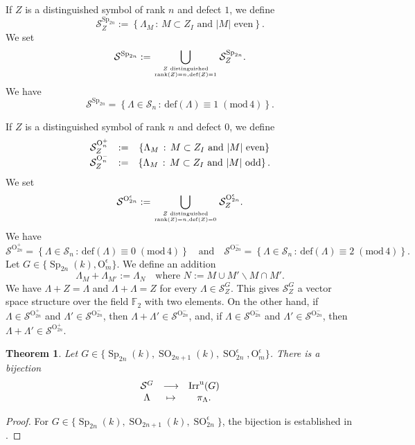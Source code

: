 \documentclass[12pt]{amsart}
\numberwithin{equation}{subsection}
\newtheorem{thm}[equation]{Theorem}
\newcommand{\FF}{\mathbb{F}}
\newcommand{\cS}{\mathcal{S}}
\newcommand{\unip}{\mathrm{u}}
\newcommand{\rank}{\operatorname{rank}}
\newcommand{\Irr}{\operatorname{Irr}}
\newcommand{\Sp}{\operatorname{Sp}}
\newcommand{\SO}{\operatorname{SO}}
\def\rO{{\mathrm{O}}}
\def\defect{{\mathrm{def}}}
\def\modu{{\mathrm{mod}}}
\def\modu{{\mathrm{mod}}}
\begin{document}
If $Z$ is a distinguished symbol of rank $n$ and defect $1$, we define 
\begin{equation}
\cS_Z^{\Sp_{2n}}:=\left\{\Lambda_M\,:\, \text{$M\subset Z_I$ and $|M|$ even}\right\}.
\end{equation}
We set
\begin{equation}
\cS^{\Sp_{2n}}:=\bigcup_{\text{$Z$ distinguished}\atop\rank(Z)=n,\defect(Z)=1}
\cS_Z^{\Sp_{2n}}.
\end{equation}
We have 
\begin{equation}
\cS^{\Sp_{2n}}=\left\{\Lambda\in\cS_n\,:\,\defect(\Lambda)\equiv 1\;(\modu \,4)\right\}.
\end{equation}

If $Z$ is a distinguished symbol of rank $n$ and defect $0$, we define 
\begin{equation}
\begin{matrix}
\cS_Z^{\rO^+_n}&:=&\left\{\Lambda_M\,:\, \text{$M\subset Z_I$ and $|M|$ even}\right\}\cr
\cS_Z^{\rO^-_n}&:=&\left\{\Lambda_M\,:\, \text{$M\subset Z_I$ and $|M|$ odd}\right\}.
\end{matrix}
\end{equation}
We set
\begin{equation}
\cS^{\rO_{2n}^\epsilon}:=\bigcup_{\text{$Z$ distinguished}\atop\rank(Z)=n,\defect(Z)=0} \cS_Z^{\rO^\epsilon_{2n}}.
\end{equation}
We have 
\[
\cS^{\rO_{2n}^+}=\left\{\Lambda\in\cS_n\,:\,\defect(\Lambda)\equiv 0\;(\modu \,4)\right\}\quad\text{and}\quad
\cS^{\rO_{2n}^-}=\left\{\Lambda\in\cS_n\,:\,\defect(\Lambda)\equiv 2\;(\modu \,4)\right\}.
\]
Let $G\in\{\Sp_{2n}(k),  \rO_{m}^\epsilon\}$. We define an addition
\begin{equation}
\Lambda_{M}+\Lambda_{M'}:=\Lambda_N\quad\text{where $N:=M\cup M'\backslash M\cap M'$.}
\end{equation}
We have $\Lambda+Z=\Lambda$ and $\Lambda+\Lambda=Z$ for every $\Lambda\in\cS_Z^G$. This gives $\cS_Z^G$ a vector space
structure over the field $\FF_2$ with two elements.
On the other hand, if $\Lambda\in\cS^{\rO_{2n}^+}$ and $\Lambda'\in\cS^{\rO_{2n}^-}$, then $\Lambda+\Lambda'\in\cS^{\rO_{2n}^-}$, and, if  $\Lambda\in\cS^{\rO_{2n}^-}$ and $\Lambda'\in\cS^{\rO_{2n}^-} $, 
then $\Lambda+\Lambda'\in\cS^{\rO_{2n}^+}$.

\begin{thm} \label{thm:Lusz-Class}
Let $G\in\{\Sp_{2n}(k), \SO_{2n+1}(k),\SO^\epsilon_{2n}, \rO_{m}^\epsilon\}$.
There is a bijection
\begin{equation} \label{eqn:Lus77Sp}
\begin{matrix}\cS^{G}&\longrightarrow&\Irr^\unip(G)\cr
\Lambda&\mapsto& \pi_\Lambda.
\end{matrix}
\end{equation}
\end{thm}
\begin{proof}
For $G\in\{\Sp_{2n}(k), \SO_{2n+1}(k),\SO^\epsilon_{2n}\}$, the bijection is established in \cite[Theorem~8.2]{LusInvent77}.
\end{proof}
\end{document}
